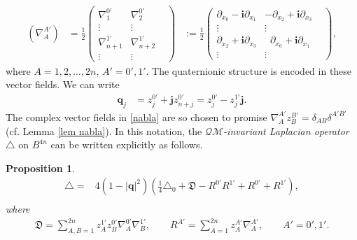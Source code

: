 \documentclass[a4paper,11pt]{amsart}
\numberwithin{equation}{section}
\newtheorem{prop}{Proposition}[section]
\begin{document}
\begin{equation}\begin{aligned}\label{nabla}
\left(\nabla_{A}^{A'}\right)&=\frac{1}{2}\left(\begin{matrix}\nabla_1^{0'}& \nabla_{2}^{0'}&\\\vdots&\vdots\\ \nabla_{n+1}^{1'}&\nabla_{n+2}^{1'}\\\vdots&\vdots&\end{matrix}\right)
&:=\frac{1}{2}\left(\begin{matrix}\partial_{x_0}-\mathbf{i}\partial_{x_1}& -\partial_{x_2}+\mathbf{i}\partial_{x_3}\\\vdots&\vdots\\ \partial_{x_2}+\mathbf{i}\partial_{x_3}&\;\;\partial_{x_0}+\mathbf{i}\partial_{x_1}\\\vdots&\vdots&\end{matrix}\right),
\end{aligned}\end{equation}
where $A=1,2,\dots,2n$, $A'=0',1'$.
The quaternionic structure is encoded in these vector fields. We can write
\begin{equation}\begin{aligned}\label{def qj}
\mathbf{q}_j&=z_j^{0'}+\mathbf{j}z_{n+j}^{0'}=z_j^{0'}-z_{j}^{1'}\mathbf{j}.
\end{aligned}\end{equation}
The complex vector fields in \eqref{nabla} are so chosen to promise $\nabla_A^{A'}z_B^{B'}=\delta_{AB}\delta^{A'B'}$(cf. Lemma \ref{lem nabla}). In this notation, the\emph{ $\mathcal{QM}$-invariant Laplacian operator} $\triangle$ on $B^{4n}$ can be written explicitly as follows.
\begin{prop}\label{invariant laplace}
\begin{equation}\begin{aligned}\label{ex form}
\triangle=& 4(1-|\mathbf{q}|^2)\left( \frac14\triangle_0 + \mathfrak{D} -R^{0'}R^{1'}+ R^{0'}+R^{1'} \right),\\
\end{aligned}\end{equation}
where
\begin{equation}\begin{aligned}\label{def D R}
\mathfrak{D}=\sum_{A,B=1}^{2n}z_A^{1'} z_B^{0'}\nabla_A^{0'} \nabla_B^{1'},\qquad R^{A'}=\sum_{A=1}^{2n}z_A^{A'}\nabla_A^{A'},\qquad A'=0',1'.
\end{aligned}\end{equation}
\end{prop}
\end{document}
